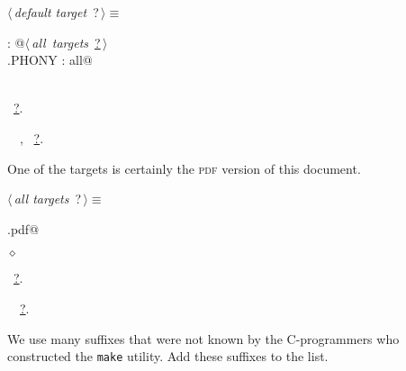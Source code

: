 \documentclass[twoside]{artikel3}
\renewcommand{\NWlink}[2]{\hyperlink{#1}{#2}}
\renewcommand{\NWtarget}[2]{\hypertarget{#1}{#2}}
\renewcommand{\NWsep}{$\diamond$\rule[-1\baselineskip]{0pt}{1\baselineskip}}
\renewcommand{\NWlink}[2]{\hyperlink{#1}{#2}}
\renewcommand{\NWtarget}[2]{\hypertarget{#1}{#2}}
\begin{document}
\begin{flushleft} \small
\begin{minipage}{\linewidth}\label{scrap8}\raggedright\small
\NWtarget{nuweb?}{} $\langle\,${\itshape default target}\nobreak\ {\footnotesize {?}}$\,\rangle\equiv$
\vspace{-1ex}
\begin{list}{}{} \item
\mbox{}\verb@all : @\hbox{$\langle\,${\itshape all targets}\nobreak\ {\footnotesize \NWlink{nuweb?}{?}}$\,\rangle$}\verb@@\\
\mbox{}\verb@.PHONY : all@\\
\mbox{}\verb@@\\
\mbox{}\verb@@{\NWsep}
\end{list}
\vspace{-1.5ex}
\footnotesize
\begin{list}{}{\setlength{\itemsep}{-\parsep}\setlength{\itemindent}{-\leftmargin}}
\item \NWtxtMacroRefIn\ \NWlink{nuweb?}{?}.
\item \NWtxtIdentsDefed\nobreak\  \verb@all@\nobreak\ \NWtxtIdentsNotUsed, \verb@PHONY@\nobreak\ \NWlink{nuweb?}{?}.
\item{}
\end{list}
\end{minipage}\vspace{4ex}
\end{flushleft}
One of the targets is certainly the \textsc{pdf} version of this
document.

\begin{flushleft} \small
\begin{minipage}{\linewidth}\label{scrap9}\raggedright\small
\NWtarget{nuweb?}{} $\langle\,${\itshape all targets}\nobreak\ {\footnotesize {?}}$\,\rangle\equiv$
\vspace{-1ex}
\begin{list}{}{} \item
\mbox{}\verb@myscrapexamp.pdf@{\NWsep}
\end{list}
\vspace{-1.5ex}
\footnotesize
\begin{list}{}{\setlength{\itemsep}{-\parsep}\setlength{\itemindent}{-\leftmargin}}
\item \NWtxtMacroRefIn\ \NWlink{nuweb?}{?}.
\item \NWtxtIdentsUsed\nobreak\  \verb@pdf@\nobreak\ \NWlink{nuweb?}{?}.
\item{}
\end{list}
\end{minipage}\vspace{4ex}
\end{flushleft}
We use many suffixes that were not known by the C-programmers who
constructed the \texttt{make} utility. Add these suffixes to the list.
\end{document}
